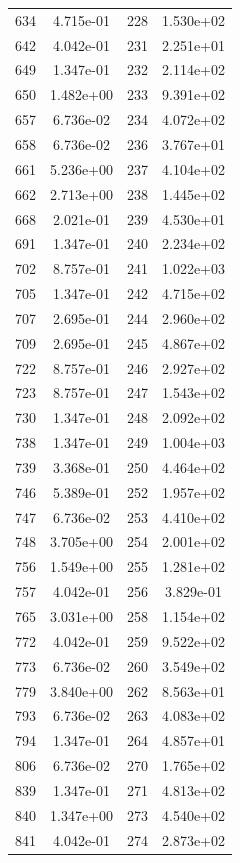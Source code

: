 \documentclass[12pt]{article}
\begin{document}
\begin{longtable}{@{}cccc@{}}
634 & 4.715e-01 & 228 & 1.530e+02 \\
642 & 4.042e-01 & 231 & 2.251e+01 \\
649 & 1.347e-01 & 232 & 2.114e+02 \\
650 & 1.482e+00 & 233 & 9.391e+02 \\
657 & 6.736e-02 & 234 & 4.072e+02 \\
658 & 6.736e-02 & 236 & 3.767e+01 \\
661 & 5.236e+00 & 237 & 4.104e+02 \\
662 & 2.713e+00 & 238 & 1.445e+02 \\
668 & 2.021e-01 & 239 & 4.530e+01 \\
691 & 1.347e-01 & 240 & 2.234e+02 \\
702 & 8.757e-01 & 241 & 1.022e+03 \\
705 & 1.347e-01 & 242 & 4.715e+02 \\
707 & 2.695e-01 & 244 & 2.960e+02 \\
709 & 2.695e-01 & 245 & 4.867e+02 \\
722 & 8.757e-01 & 246 & 2.927e+02 \\
723 & 8.757e-01 & 247 & 1.543e+02 \\
730 & 1.347e-01 & 248 & 2.092e+02 \\
738 & 1.347e-01 & 249 & 1.004e+03 \\
739 & 3.368e-01 & 250 & 4.464e+02 \\
746 & 5.389e-01 & 252 & 1.957e+02 \\
747 & 6.736e-02 & 253 & 4.410e+02 \\
748 & 3.705e+00 & 254 & 2.001e+02 \\
756 & 1.549e+00 & 255 & 1.281e+02 \\
757 & 4.042e-01 & 256 & 3.829e-01 \\
765 & 3.031e+00 & 258 & 1.154e+02 \\
772 & 4.042e-01 & 259 & 9.522e+02 \\
773 & 6.736e-02 & 260 & 3.549e+02 \\
779 & 3.840e+00 & 262 & 8.563e+01 \\
793 & 6.736e-02 & 263 & 4.083e+02 \\
794 & 1.347e-01 & 264 & 4.857e+01 \\
806 & 6.736e-02 & 270 & 1.765e+02 \\
839 & 1.347e-01 & 271 & 4.813e+02 \\
840 & 1.347e+00 & 273 & 4.540e+02 \\
841 & 4.042e-01 & 274 & 2.873e+02 \\

\end{longtable}
\end{document}
